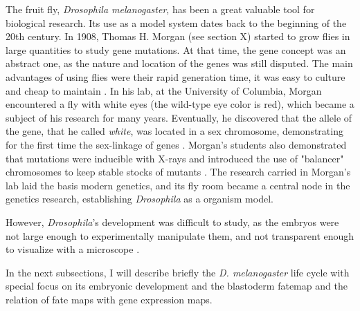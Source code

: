 The fruit fly, \textit{Drosophila melanogaster}, has been a great valuable tool for biological research.
Its use as a model system dates back to the beginning of the 20th century.
In 1908, Thomas H. Morgan (see section X) started to grow flies in large quantities to study gene mutations. At that time, the gene concept was an abstract one, as the nature and location of the genes was still disputed.
%
The main advantages of using flies were their rapid generation time, it was easy to culture and cheap to maintain \citep{Arias2008}.
%
In his lab, at the University of Columbia, Morgan encountered a fly with white eyes (the wild-type eye color is red), which became a subject of his research for many years.
Eventually, he discovered that the allele of the gene, that he called \textit{white}, was located in a sex chromosome, demonstrating for the first time the sex-linkage of genes \citep{Morgan1919}.
%
Morgan's students also demonstrated that mutations were inducible with X-rays and introduced the use of "balancer" chromosomes to keep stable stocks of mutants \citep{Arias2008}.
%
The research carried in Morgan's lab laid the basis modern genetics, and its fly room became a central node in the genetics research, establishing \textit{Drosophila} as a organism model.

However, \textit{Drosophila}'s development was difficult to study, as the embryos were not large enough to experimentally manipulate them, and not transparent enough to visualize with a microscope \citep{Gilbert2014}.


%

In the next subsections, I will describe briefly the \textit{D. melanogaster} life cycle with special focus on its embryonic development and the blastoderm fatemap and the relation of fate maps with gene expression maps.

